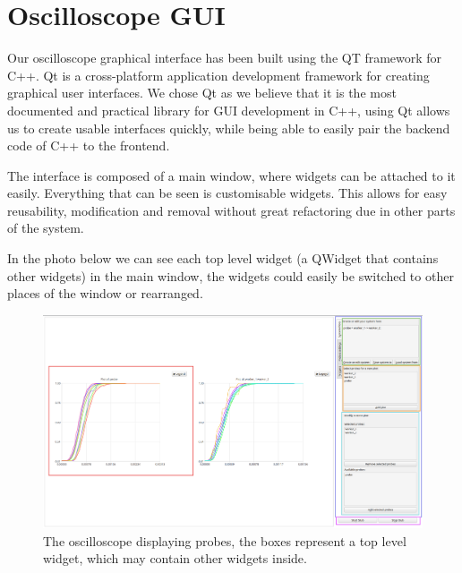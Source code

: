 \section{Oscilloscope GUI}
    Our oscilloscope graphical interface has been built using the QT framework for C++. Qt is a cross-platform application development framework for creating graphical user interfaces.
    We chose Qt as we believe that it is the most documented and practical library for GUI development in C++, using Qt allows us to create usable interfaces quickly, while being able to easily pair the backend code of C++ to the frontend.

    The interface is composed of a main window, where widgets can be attached to it easily. Everything that can be seen is customisable widgets. This allows for easy reusability, modification and removal without great refactoring due in other parts of the system.

    In the photo below we can see each top level widget (a QWidget that contains other widgets) in the main window, the widgets could easily be switched to other places of the window or rearranged.
    \begin{figure}[H]
        \begin{center}
            \includegraphics[width=\textwidth]{img/osc_an.png}
        \end{center}
        \caption{The oscilloscope displaying probes, the boxes represent a top level widget, which may contain other widgets inside.}
    \end{figure}
